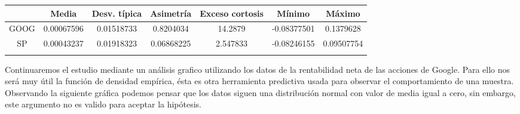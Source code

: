 \documentclass[a4paper,]{article}
\begin{document}
\begin{table}[h]
\centering
\begin{tabular}{ccccccc}
\hline
\rowcolor[HTML]{C0C0C0} 
\multicolumn{1}{|c|}{\cellcolor[HTML]{C0C0C0}Return} & \multicolumn{1}{c|}{\cellcolor[HTML]{C0C0C0}Media} & \multicolumn{1}{c|}{\cellcolor[HTML]{C0C0C0}Desv. típica} & \multicolumn{1}{c|}{\cellcolor[HTML]{C0C0C0}Asimetría} & \multicolumn{1}{c|}{\cellcolor[HTML]{C0C0C0}Exceso cortosis} & \multicolumn{1}{c|}{\cellcolor[HTML]{C0C0C0}Mínimo} & \multicolumn{1}{c|}{\cellcolor[HTML]{C0C0C0}Máximo} \\ \hline
\multicolumn{1}{|c|}{\cellcolor[HTML]{EFEFEF}GOOG}   & \multicolumn{1}{c|}{0.00067596}                  & \multicolumn{1}{c|}{0.01518733}                                   & \multicolumn{1}{c|}{0.8204034}                         & \multicolumn{1}{c|}{14.2879}                                    & \multicolumn{1}{c|}{-0.08377501}                    & \multicolumn{1}{c|}{0.1379628}                      \\ \hline
\multicolumn{1}{|c|}{\cellcolor[HTML]{EFEFEF}SP}     & \multicolumn{1}{c|}{0.00043237}                  & \multicolumn{1}{c|}{0.01918323}                                   & \multicolumn{1}{c|}{0.06868225}                        & \multicolumn{1}{c|}{2.547833}                                   & \multicolumn{1}{c|}{-0.08246155}                    & \multicolumn{1}{c|}{0.09507754}                     \\ \hline
\multicolumn{1}{l}{}                                 & \multicolumn{1}{l}{}                               & \multicolumn{1}{l}{}                                              & \multicolumn{1}{l}{}                                   & \multicolumn{1}{l}{}                                            & \multicolumn{1}{l}{}                                & \multicolumn{1}{l}{}                               
\end{tabular}
\end{table}

Continuaremos el estudio mediante un análisis grafico utilizando los datos de la rentabilidad neta de las acciones de Google. Para ello nos será muy útil la función de densidad empírica, ésta es otra herramienta predictiva usada para observar el comportamiento de una muestra. \\

Observando la siguiente gráfica podemos pensar que los datos siguen una distribución normal con valor de media igual a cero, sin embargo, este argumento no es valido para aceptar la hipótesis.
\end{document}
